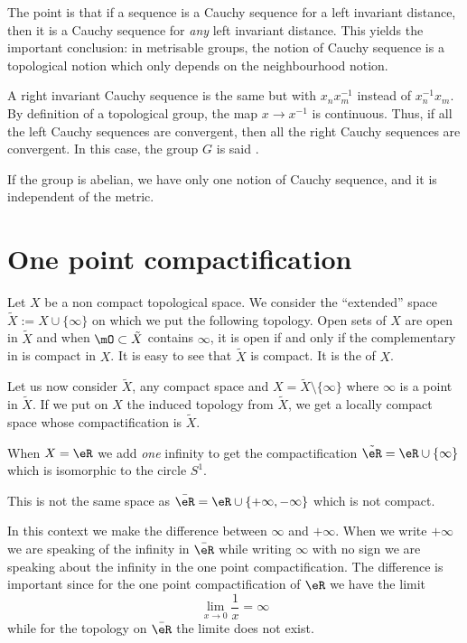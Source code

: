 The point is that if a sequence is a Cauchy sequence for a left invariant distance, then it is a Cauchy sequence for \emph{any} left invariant distance. This yields the important conclusion: in metrisable groups, the notion of Cauchy sequence is a topological notion which only depends on the neighbourhood notion.

A right invariant Cauchy sequence is the same but with $x_nx_m^{-1}$ instead of $x_n^{-1} x_m$. By definition of a topological group, the map $x\to x^{-1}$ is continuous. Thus, if all the left Cauchy sequences are convergent, then all the right Cauchy sequences are convergent. In this case, the group $G$ is said .

If the group is abelian, we have only one notion of Cauchy sequence, and it is independent of the metric.

\section{One point compactification}  \label{sec:compactific}

\begin{definition}  \label{DEFooAKWJooWKcYav}
	Let $X$ be a non compact topological space. We consider the ``extended'' space $\tilde X:=X\cup\{ \infty\}$ on which we put the following topology. Open sets of $X$ are open in $\tilde X$ and when $\mO\subset\tilde X$ contains $\infty$, it is open if and only if the complementary in is compact in $X$. It is easy to see that $\tilde X$ is compact. It is the  of $X$.
\end{definition}

Let us now consider $\tilde X$, any compact space and $X=\tilde X\setminus\{\infty\}$ where $\infty$ is a point in $\tilde X$. If we put on $X$ the induced topology from $\tilde X$, we get a locally compact space whose compactification is $\tilde X$.

\begin{example}
	When \( X=\eR\) we add \emph{one} infinity to get the compactification \( \tilde \eR=\eR\cup\{ \infty \}\) which is isomorphic to the circle \( S^1\).

	This is not the same space as \( \bar \eR=\eR\cup\{ +\infty,-\infty \}\) which is not compact.
\end{example}

In this context we make the difference between \( \infty\) and \( +\infty\). When we write \( +\infty\) we are speaking of the infinity in \( \bar \eR\) while writing \( \infty\) with no sign we are speaking about the infinity in the one point compactification. The difference is important since for the one point compactification of \( \eR\) we have the limit
\begin{equation}
	\lim_{x\to 0} \frac{1}{ x }=\infty
\end{equation}
while for the topology on \( \bar \eR\) the limite does not exist.

